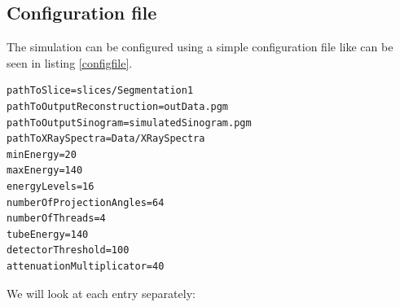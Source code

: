 \subsection{Configuration file}
\par The simulation can be configured using a simple configuration file like can be seen in listing \ref{configfile}.
\lstset{ %
  basicstyle=\footnotesize,
}
\begin{lstlisting}[caption={Sample configuration file},label=configfile,captionpos=b]
pathToSlice=slices/Segmentation1
pathToOutputReconstruction=outData.pgm
pathToOutputSinogram=simulatedSinogram.pgm
pathToXRaySpectra=Data/XRaySpectra
minEnergy=20
maxEnergy=140
energyLevels=16
numberOfProjectionAngles=64
numberOfThreads=4
tubeEnergy=140
detectorThreshold=100
attenuationMultiplicator=40
\end{lstlisting}
\par We will look at each entry separately:

